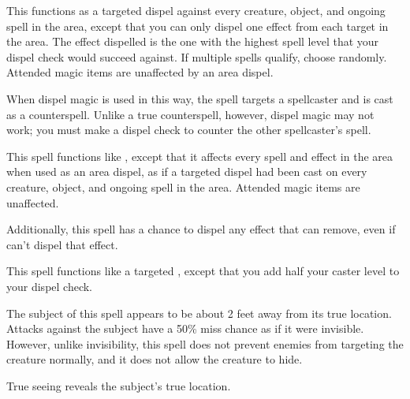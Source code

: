 \begin{spelleffect}
  \par This functions as a targeted dispel against every creature, object, and ongoing spell in the area, except that you can only dispel one effect from each target in the area. The effect dispelled is the one with the highest spell level that your dispel check would succeed against. If multiple spells qualify, choose randomly. Attended magic items are unaffected by an area dispel.

  \par {} When dispel magic is used in this way, the spell targets a spellcaster and is cast as a counterspell. Unlike a true counterspell, however, dispel magic may not work; you must make a dispel check to counter the other spellcaster's spell.
\end{spelleffect}

\begin{spelleffect}
  This spell functions like , except that it affects every spell and effect in the area when used as an area dispel, as if a targeted dispel had been cast on every creature, object, and ongoing spell in the area. Attended magic items are unaffected.
  \par Additionally, this spell has a chance to dispel any effect that  can remove, even if  can't dispel that effect.
\end{spelleffect}

\begin{spelleffect}
  This spell functions like a targeted , except that you add half your caster level to your dispel check.
\end{spelleffect}

\spellrng{\rngclose}
\begin{spelleffect}
  The subject of this spell appears to be about 2 feet away from its true location. Attacks against the subject have a 50\% miss chance as if it were invisible. However, unlike invisibility, this spell does not prevent enemies from targeting the creature normally, and it does not allow the creature to hide.
\end{spelleffect}
\begin{spellnotes}
  True seeing reveals the subject's true location.
\end{spellnotes}


